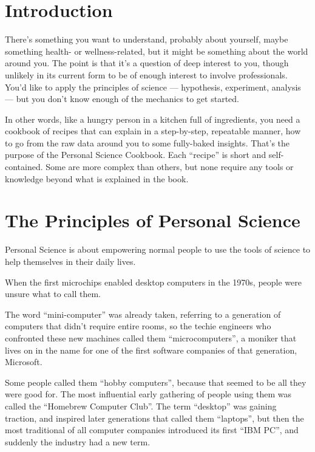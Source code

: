 \documentclass[
]{book}
\begin{document}
\hypertarget{intro}{%
\chapter{Introduction}\label{intro}}

There's something you want to understand, probably about yourself, maybe something health- or wellness-related, but it might be something about the world around you. The point is that it's a question of deep interest to you, though unlikely in its current form to be of enough interest to involve professionals. You'd like to apply the principles of science --- hypothesis, experiment, analysis --- but you don't know enough of the mechanics to get started.

In other words, like a hungry person in a kitchen full of ingredients, you need a cookbook of recipes that can explain in a step-by-step, repeatable manner, how to go from the raw data around you to some fully-baked insights. That's the purpose of the Personal Science Cookbook. Each ``recipe'' is short and self-contained. Some are more complex than others, but none require any tools or knowledge beyond what is explained in the book.

\hypertarget{the-principles-of-personal-science}{%
\chapter{The Principles of Personal Science}\label{the-principles-of-personal-science}}

Personal Science is about empowering normal people to use the tools of science to help themselves in their daily lives.

When the first microchips enabled desktop computers in the 1970s, people were unsure what to call them.

The word ``mini-computer'' was already taken, referring to a generation of computers that didn't require entire rooms, so the techie engineers who confronted these new machines called them ``microcomputers'', a moniker that lives on in the name for one of the first software companies of that generation, Microsoft.

Some people called them ``hobby computers'', because that seemed to be all they were good for. The most influential early gathering of people using them was called the ``Homebrew Computer Club''. The term ``desktop'' was gaining traction, and inspired later generations that called them ``laptops'', but then the most traditional of all computer companies introduced its first ``IBM PC'', and suddenly the industry had a new term.
\end{document}
